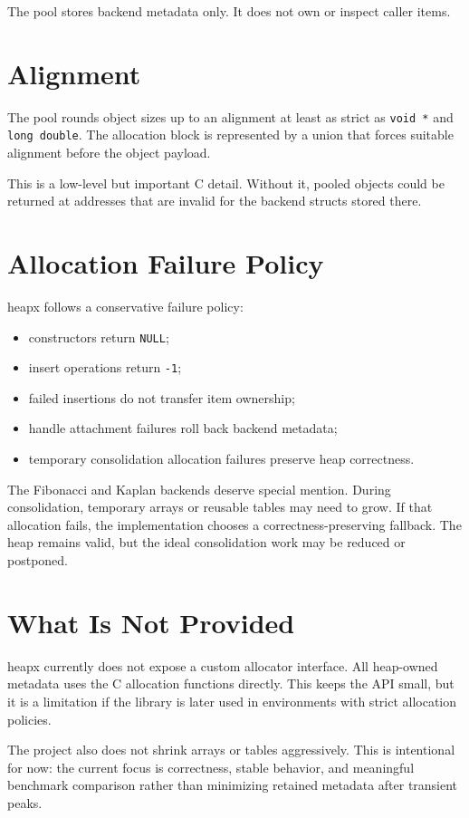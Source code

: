 The pool stores backend metadata only.
It does not own or inspect caller items.

\section{Alignment}

The pool rounds object sizes up to an alignment at least as strict as \texttt{void *} and \texttt{long double}.
The allocation block is represented by a union that forces suitable alignment before the object payload.

This is a low-level but important C detail.
Without it, pooled objects could be returned at addresses that are invalid for the backend structs stored there.

\section{Allocation Failure Policy}

heapx follows a conservative failure policy:

\begin{itemize}
    \item constructors return \texttt{NULL};
    \item insert operations return \texttt{-1};
    \item failed insertions do not transfer item ownership;
    \item handle attachment failures roll back backend metadata;
    \item temporary consolidation allocation failures preserve heap correctness.
\end{itemize}

The Fibonacci and Kaplan backends deserve special mention.
During consolidation, temporary arrays or reusable tables may need to grow.
If that allocation fails, the implementation chooses a correctness-preserving fallback.
The heap remains valid, but the ideal consolidation work may be reduced or postponed.

\section{What Is Not Provided}

heapx currently does not expose a custom allocator interface.
All heap-owned metadata uses the C allocation functions directly.
This keeps the API small, but it is a limitation if the library is later used in environments with strict allocation policies.

The project also does not shrink arrays or tables aggressively.
This is intentional for now: the current focus is correctness, stable behavior, and meaningful benchmark comparison rather than minimizing retained metadata after transient peaks.
